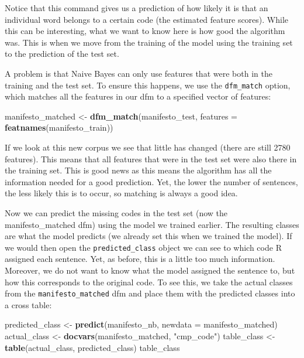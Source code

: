 \documentclass[
]{book}
\newenvironment{Shaded}{\begin{snugshade}}{\end{snugshade}}
\newcommand{\AttributeTok}[1]{\textcolor[rgb]{0.13,0.29,0.53}{#1}}
\newcommand{\FunctionTok}[1]{\textcolor[rgb]{0.13,0.29,0.53}{\textbf{#1}}}
\newcommand{\NormalTok}[1]{#1}
\newcommand{\OtherTok}[1]{\textcolor[rgb]{0.56,0.35,0.01}{#1}}
\newcommand{\StringTok}[1]{\textcolor[rgb]{0.31,0.60,0.02}{#1}}
\begin{document}
Notice that this command gives us a prediction of how likely it is that an individual word belongs to a certain code (the estimated feature scores). While this can be interesting, what we want to know here is how good the algorithm was. This is when we move from the training of the model using the training set to the prediction of the test set.

A problem is that Naive Bayes can only use features that were both in the training and the test set. To ensure this happens, we use the \texttt{dfm\_match} option, which matches all the features in our dfm to a specified vector of features:

\begin{Shaded}
\begin{Highlighting}[]
\NormalTok{manifesto\_matched }\OtherTok{\textless{}{-}} \FunctionTok{dfm\_match}\NormalTok{(manifesto\_test, }\AttributeTok{features =} \FunctionTok{featnames}\NormalTok{(manifesto\_train))}
\end{Highlighting}
\end{Shaded}

If we look at this new corpus we see that little has changed (there are still 2780 features). This means that all features that were in the test set were also there in the training set. This is good news as this means the algorithm has all the information needed for a good prediction. Yet, the lower the number of sentences, the less likely this is to occur, so matching is always a good idea.

Now we can predict the missing codes in the test set (now the manifesto\_matched dfm) using the model we trained earlier. The resulting classes are what the model predicts (we already set this when we trained the model). If we would then open the \texttt{predicted\_class} object we can see to which code R assigned each sentence. Yet, as before, this is a little too much information. Moreover, we do not want to know what the model assigned the sentence to, but how this corresponds to the original code. To see this, we take the actual classes from the \texttt{manifesto\_matched} dfm and place them with the predicted classes into a cross table:

\begin{Shaded}
\begin{Highlighting}[]
\NormalTok{predicted\_class }\OtherTok{\textless{}{-}} \FunctionTok{predict}\NormalTok{(manifesto\_nb, }\AttributeTok{newdata =}\NormalTok{ manifesto\_matched)}
\NormalTok{actual\_class }\OtherTok{\textless{}{-}} \FunctionTok{docvars}\NormalTok{(manifesto\_matched, }\StringTok{"cmp\_code"}\NormalTok{)}
\NormalTok{table\_class }\OtherTok{\textless{}{-}} \FunctionTok{table}\NormalTok{(actual\_class, predicted\_class)}
\NormalTok{table\_class}
\end{Highlighting}
\end{Shaded}
\end{document}
